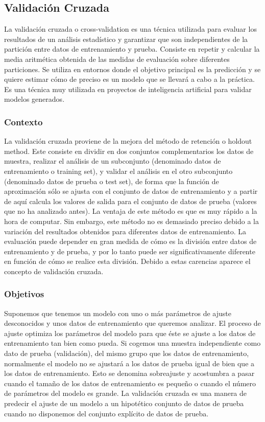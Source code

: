 \documentclass[10pt,a4paper]{article}
\begin{document}
\subsection{Validación Cruzada}

La validación cruzada o cross-validation es una técnica utilizada para evaluar los resultados de un análisis estadístico y garantizar que son independientes de la partición entre datos de entrenamiento y prueba. Consiste en repetir y calcular la media aritmética obtenida de las medidas de evaluación sobre diferentes particiones. Se utiliza en entornos donde el objetivo principal es la predicción y se quiere estimar cómo de preciso es un modelo que se llevará a cabo a la práctica. Es una técnica muy utilizada en proyectos de inteligencia artificial para validar modelos generados.

\subsubsection{Contexto}
La validación cruzada proviene de la mejora del método de retención o holdout method. Este consiste en dividir en dos conjuntos complementarios los datos de muestra, realizar el análisis de un subconjunto (denominado datos de entrenamiento o training set), y validar el análisis en el otro subconjunto (denominado datos de prueba o test set), de forma que la función de aproximación sólo se ajusta con el conjunto de datos de entrenamiento y a partir de aquí calcula los valores de salida para el conjunto de datos de prueba (valores que no ha analizado antes). La ventaja de este método es que es muy rápido a la hora de computar. Sin embargo, este método no es demasiado preciso debido a la variación del resultados obtenidos para diferentes datos de entrenamiento. La evaluación puede depender en gran medida de cómo es la división entre datos de entrenamiento y de prueba, y por lo tanto puede ser significativamente diferente en función de cómo se realice esta división. Debido a estas carencias aparece el concepto de validación cruzada.

\subsubsection{Objetivos}
Suponemos que tenemos un modelo con uno o más parámetros de ajuste desconocidos y unos datos de entrenamiento que queremos analizar. El proceso de ajuste optimiza los parámetros del modelo para que éste se ajuste a los datos de entrenamiento tan bien como pueda. Si cogemos una muestra independiente como dato de prueba (validación), del mismo grupo que los datos de entrenamiento, normalmente el modelo no se ajustará a los datos de prueba igual de bien que a los datos de entrenamiento. Esto se denomina sobreajuste y acostumbra a pasar cuando el tamaño de los datos de entrenamiento es pequeño o cuando el número de parámetros del modelo es grande. La validación cruzada es una manera de predecir el ajuste de un modelo a un hipotético conjunto de datos de prueba cuando no disponemos del conjunto explícito de datos de prueba.
\end{document}
